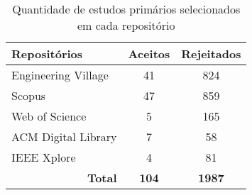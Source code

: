 \begin{table}[!ht]
\centering
\caption{Quantidade de estudos primários selecionados em cada repositório}
\label{tab:rev:selecao-final}
\begin{tabular}{|l|c|c|}
\hline
\textbf{Repositórios} & \textbf{Aceitos} & \textbf{Rejeitados} \\ \hline
Engineering Village & 41 & 824 \\ \hline
Scopus  & 47 & 859 \\ \hline
Web of Science & 5 & 165 \\ \hline
ACM Digital Library & 7 & 58 \\ \hline
IEEE Xplore & 4 & 81 \\ \hline
\multicolumn{1}{|r|}{\textbf{Total}} & \textbf{104} & \textbf{1987} \\ \hline
\end{tabular}
\fdadospesquisa
\end{table}
